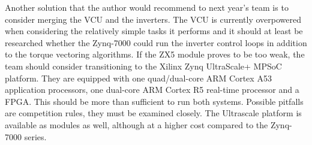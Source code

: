 Another solution that the author would recommend to next year's team is to consider merging the VCU and the inverters. The VCU is currently overpowered when considering the relatively simple tasks it performs and it should at least be researched whether the Zynq-7000 could run the inverter control loops in addition to the torque vectoring algorithms. If the ZX5 module proves to be too weak, the team should consider transitioning to the Xilinx Zynq UltraScale+ MPSoC platform. They are equipped with one quad/dual-core ARM Cortex A53 application processors, one dual-core ARM Cortex R5 real-time processor and a FPGA. This should be more than sufficient to run both systems. Possible pitfalls are competition rules, they must be examined closely. The Ultrascale platform is available as modules as well, although at a higher cost compared to the Zynq-7000 series.


